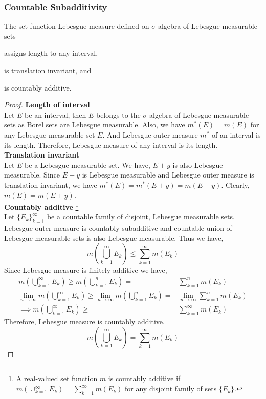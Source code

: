 \subsubsection{Countable Subadditivity}
\begin{theorem}
	The set function Lebesgue measure defined on $\sigma$ algebra of Lebesgue measurable sets
	\begin{enumerate*}
		\item assigns length to any interval, 
		\item is translation invariant, and
		\item is countably additive.
	\end{enumerate*}
\end{theorem}
\begin{proof}
\textbf{Length of interval}\\
	Let $E$ be an interval, then $E$ belongs to the $\sigma$ algebra of Lebesgue measurable sets as Borel sets are Lebesgue measurable.
	Also, we have $m^\ast(E) = m(E)$ for any Lebesgue measurable set $E$.
	And Lebesgue outer measure $m^\ast$ of an interval is its length.
	Therefore, Lebesgue measure of any interval is its length.\\

	\textbf{Translation invariant}\\
	Let $E$ be a Lebesgue measurable set.
	We have, $E+y$ is also Lebesgue measurable.
	Since $E+y$ is Lebesgue measurable and Lebesgue outer measure is translation invariant, we have $m^\ast(E) = m^\ast(E+y) = m(E+y)$.
	Clearly, $m(E) = m(E+y)$.\\

	\textbf{Countably additive}
	\footnote{ A real-valued set function $m$ is countably additive if $m(\cup_{k=1}^\infty E_k) = \sum_{k=1}^\infty m(E_k)$ for any disjoint family of sets $\{E_k\}$.}\\
	Let $\{ E_k \}_{k=1}^\infty$ be a countable family of disjoint, Lebesgue measurable sets.
	Lebesgue outer measure is countably subadditive and countable union of Lebesgue measurable sets is also Lebesgue measurable.
	Thus we have,
	\begin{equation*}
	 	m \left( \bigcup_{k=1}^\infty E_k \right) \le \sum_{k=1}^\infty m(E_k)
	\end{equation*}
	Since Lebesgue measure is finitely additive we have,
	\begin{align*}
		m \left( \bigcup_{k=1}^\infty E_k \right) \ge m \left( \bigcup_{k=1}^n E_k \right) = & \sum_{k=1}^n m(E_k)\\
		\lim_{n \to \infty} m \left( \bigcup_{k=1}^\infty E_k \right) \ge \lim_{n \to \infty} m \left( \bigcup_{k=1}^n E_k \right) = & \lim_{n \to \infty} \sum_{k=1}^n m(E_k)\\
	 	\implies m \left( \bigcup_{k=1}^\infty E_k \right) \ge & \sum_{k=1}^\infty m(E_k)
	\end{align*}
	Therefore, Lebesgue measure is countably additive.
	\begin{equation*}
	 	m \left( \bigcup_{k=1}^\infty E_k \right) = \sum_{k=1}^\infty m(E_k)
	\end{equation*}
\end{proof}
